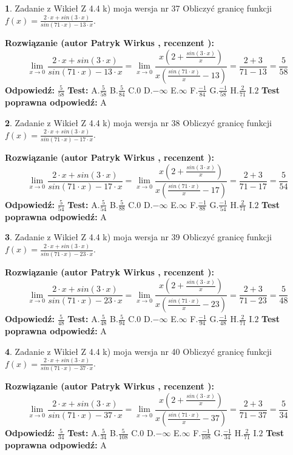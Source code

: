 \documentclass[12pt, a4paper]{article}
\theoremstyle{definition} %
\newtheorem{zad}{}
\newcommand{\zadStart}[1]{\begin{zad}#1\newline}
\newcommand{\zadStop}{\end{zad}}
\newcommand{\rozwStart}[2]{\noindent \textbf{Rozwiązanie (autor #1 , recenzent #2): }\newline}
\newcommand{\rozwStop}{\newline}
\newcommand{\odpStart}{\noindent \textbf{Odpowiedź:}\newline}
\newcommand{\odpStop}{\newline}
\newcommand{\testStart}{\noindent \textbf{Test:}\newline}
\newcommand{\testStop}{\newline}
\newcommand{\kluczStart}{\noindent \textbf{Test poprawna odpowiedź:}\newline}
\newcommand{\kluczStop}{\newline}
\begin{document}
\zadStart{Zadanie z Wikieł Z 4.4 k) moja wersja nr 37}
Obliczyć granicę funkcji $f(x)=\frac{2\cdot x +sin(3\cdot x)}{sin(71\cdot x) -13\cdot x}$.
\zadStop
\rozwStart{Patryk Wirkus}{}
$$\lim\limits_{x\to 0}\frac{2\cdot x +sin(3\cdot x)}{sin(71\cdot x) -13\cdot x}
=\lim\limits_{x\to 0}\frac{x(2+\frac{sin(3\cdot x)}{x})}{x(\frac{sin(71\cdot x)}{x}-13)}
=\frac{2+3}{71-13} = \frac{5}{58}$$
\rozwStop
\odpStart
$\frac{5}{58}$
\odpStop
\testStart
A.$\frac{5}{58}$
B.$\frac{5}{84}$
C.$0$
D.$-\infty$
E.$\infty$
F.$\frac{-1}{84}$
G.$\frac{-1}{58}$
H.$\frac{2}{71}$
I.$2$
\testStop
\kluczStart
A
\kluczStop



\zadStart{Zadanie z Wikieł Z 4.4 k) moja wersja nr 38}
Obliczyć granicę funkcji $f(x)=\frac{2\cdot x +sin(3\cdot x)}{sin(71\cdot x) -17\cdot x}$.
\zadStop
\rozwStart{Patryk Wirkus}{}
$$\lim\limits_{x\to 0}\frac{2\cdot x +sin(3\cdot x)}{sin(71\cdot x) -17\cdot x}
=\lim\limits_{x\to 0}\frac{x(2+\frac{sin(3\cdot x)}{x})}{x(\frac{sin(71\cdot x)}{x}-17)}
=\frac{2+3}{71-17} = \frac{5}{54}$$
\rozwStop
\odpStart
$\frac{5}{54}$
\odpStop
\testStart
A.$\frac{5}{54}$
B.$\frac{5}{88}$
C.$0$
D.$-\infty$
E.$\infty$
F.$\frac{-1}{88}$
G.$\frac{-1}{54}$
H.$\frac{2}{71}$
I.$2$
\testStop
\kluczStart
A
\kluczStop



\zadStart{Zadanie z Wikieł Z 4.4 k) moja wersja nr 39}
Obliczyć granicę funkcji $f(x)=\frac{2\cdot x +sin(3\cdot x)}{sin(71\cdot x) -23\cdot x}$.
\zadStop
\rozwStart{Patryk Wirkus}{}
$$\lim\limits_{x\to 0}\frac{2\cdot x +sin(3\cdot x)}{sin(71\cdot x) -23\cdot x}
=\lim\limits_{x\to 0}\frac{x(2+\frac{sin(3\cdot x)}{x})}{x(\frac{sin(71\cdot x)}{x}-23)}
=\frac{2+3}{71-23} = \frac{5}{48}$$
\rozwStop
\odpStart
$\frac{5}{48}$
\odpStop
\testStart
A.$\frac{5}{48}$
B.$\frac{5}{94}$
C.$0$
D.$-\infty$
E.$\infty$
F.$\frac{-1}{94}$
G.$\frac{-1}{48}$
H.$\frac{2}{71}$
I.$2$
\testStop
\kluczStart
A
\kluczStop



\zadStart{Zadanie z Wikieł Z 4.4 k) moja wersja nr 40}
Obliczyć granicę funkcji $f(x)=\frac{2\cdot x +sin(3\cdot x)}{sin(71\cdot x) -37\cdot x}$.
\zadStop
\rozwStart{Patryk Wirkus}{}
$$\lim\limits_{x\to 0}\frac{2\cdot x +sin(3\cdot x)}{sin(71\cdot x) -37\cdot x}
=\lim\limits_{x\to 0}\frac{x(2+\frac{sin(3\cdot x)}{x})}{x(\frac{sin(71\cdot x)}{x}-37)}
=\frac{2+3}{71-37} = \frac{5}{34}$$
\rozwStop
\odpStart
$\frac{5}{34}$
\odpStop
\testStart
A.$\frac{5}{34}$
B.$\frac{5}{108}$
C.$0$
D.$-\infty$
E.$\infty$
F.$\frac{-1}{108}$
G.$\frac{-1}{34}$
H.$\frac{2}{71}$
I.$2$
\testStop
\kluczStart
A
\kluczStop
\end{document}
